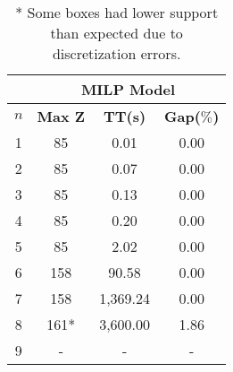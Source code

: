 \begin{table}[htbp]
    \centering
        \begin{tabular}{|c|c|c|c|}
            \hline
            & \multicolumn{ 3}{c|}{\textbf{MILP Model}} \\ \hline
            \textbf{$n$} & \textbf{Max Z} & \textbf{TT(s)} & \textbf{Gap($\%$)} \\ \hline
            1  & 85   & 0.01     & 0.00 \\ 
            2  & 85   & 0.07     & 0.00 \\ 
            3  & 85   & 0.13     & 0.00 \\ 
            4  & 85   & 0.20     & 0.00 \\ 
            5  & 85   & 2.02     & 0.00 \\ 
            6  & 158  & 90.58    & 0.00 \\ 
            7  & 158  & 1,369.24 & 0.00 \\ 
            8  & 161* & 3,600.00 & 1.86 \\
            9  & -    & -        & -    \\ \hline
        \end{tabular}
    \caption*{* Some boxes had lower support than expected due to discretization errors.}
    \end{table}
